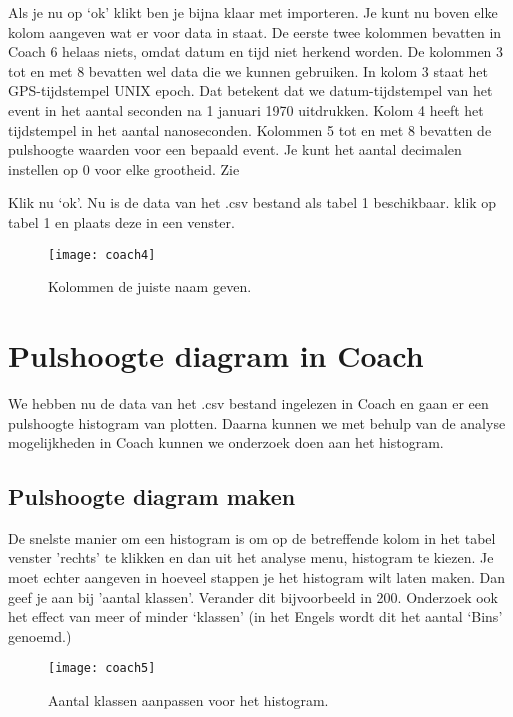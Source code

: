 Als je nu op `ok' klikt ben je bijna klaar met importeren. Je kunt nu boven elke
kolom aangeven wat er voor data in staat. De eerste twee kolommen bevatten in Coach 6 
helaas niets, omdat datum en tijd niet herkend worden. De kolommen 3 tot en met 
8 bevatten wel data die we kunnen gebruiken. In kolom 3 staat het GPS-tijdstempel UNIX epoch.
Dat betekent dat we datum-tijdstempel van het event in het aantal seconden na 1 januari 1970 uitdrukken.
Kolom 4 heeft het tijdstempel in het aantal nanoseconden.
Kolommen 5 tot en met 8 bevatten de pulshoogte waarden voor een bepaald event.
Je kunt het aantal decimalen instellen op 0 voor elke grootheid. Zie  

Klik nu `ok'. Nu is de data van het .csv bestand als tabel 1 beschikbaar.
klik op tabel 1 en plaats deze in een venster.

\begin{figure}
    \centering
    \texttt{[image: coach4]}
    \caption{Kolommen de juiste naam geven.}
    \label{fig:coach4}
\end{figure}


\section{Pulshoogte diagram in Coach}

We hebben nu de data van het .csv bestand ingelezen in Coach en gaan er een
pulshoogte histogram van plotten. Daarna kunnen we met behulp van de analyse 
mogelijkheden in Coach kunnen we onderzoek doen aan het histogram.

\subsection{Pulshoogte diagram maken}

De snelste manier om een histogram is om op de betreffende kolom in het tabel venster
'rechts' te klikken en dan uit het analyse menu, histogram te kiezen.
Je moet echter aangeven in hoeveel stappen je het histogram wilt laten maken.
Dan geef je aan bij 'aantal klassen'. Verander dit bijvoorbeeld in 200. Onderzoek
ook het effect van meer of minder `klassen' (in het Engels wordt dit het aantal 
`Bins' genoemd.)

\begin{figure}
    \centering
    \texttt{[image: coach5]}
    \caption{Aantal klassen aanpassen voor het histogram.}
    \label{fig:coach5}
\end{figure}

